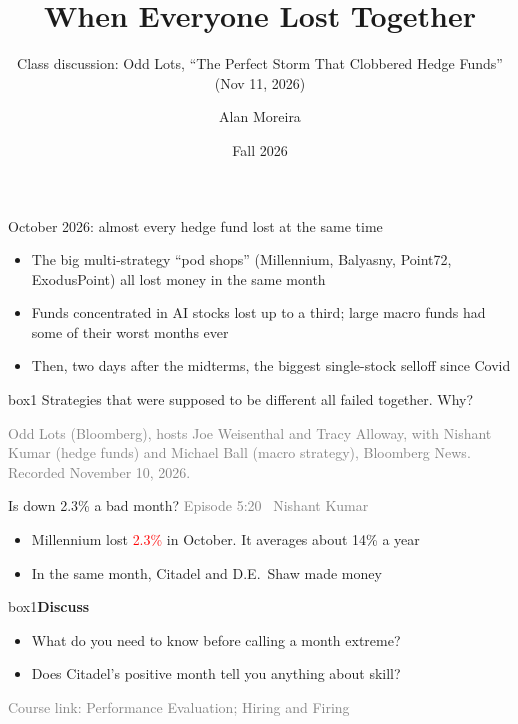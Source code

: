 \documentclass[aspectratio=169,10pt]{beamer}
\title{When Everyone Lost Together}
\subtitle{Class discussion: Odd Lots, ``The Perfect Storm That Clobbered Hedge Funds'' (Nov 11, 2026)}
\author[A. Moreira]{Alan Moreira}
\institute[Data-Driven Investing]{NYU Stern --- Data-Driven Investing}
\date{Fall 2026}
\newcommand{\src}[1]{{\footnotesize\textcolor{gray}{Episode #1}}\par\vskip 6pt}
\newcommand{\course}[1]{{\footnotesize\textcolor{gray}{Course link: #1}}}
\newenvironment{discuss}{\begin{beamercolorbox}[rounded=true,sep=8pt]{box1}\textbf{Discuss}\par\vskip 3pt}{\end{beamercolorbox}}
\begin{document}
\begin{frame}
\titlepage
\end{frame}

\begin{frame}{October 2026: almost every hedge fund lost at the same time}
\vskip 4pt
\begin{itemize}
\item The big multi-strategy ``pod shops'' (Millennium, Balyasny, Point72, ExodusPoint) all lost money in the same month
\vskip 7pt
\item Funds concentrated in AI stocks lost up to a third; large macro funds had some of their worst months ever
\vskip 7pt
\item Then, two days after the midterms, the biggest single-stock selloff since Covid
\end{itemize}
\vskip 12pt
\begin{beamercolorbox}[rounded=true,sep=8pt,center]{box1}
Strategies that were supposed to be different all failed together. Why?
\end{beamercolorbox}
\vfill
{\footnotesize\textcolor{gray}{Odd Lots (Bloomberg), hosts Joe Weisenthal and Tracy Alloway, with Nishant Kumar (hedge funds) and Michael Ball (macro strategy), Bloomberg News. Recorded November 10, 2026.}}
\end{frame}

\begin{frame}[label=q1]{Is down 2.3\% a bad month?}
\src{5:20 \textbullet\ Nishant Kumar}
\begin{itemize}
\item Millennium lost \textcolor{red}{2.3\%} in October. It averages about 14\% a year
\vskip 6pt
\item In the same month, Citadel and D.E.\ Shaw made money
\end{itemize}
\vskip 12pt
\begin{discuss}
\begin{itemize}
\item What do you need to know before calling a month extreme?
\item Does Citadel's positive month tell you anything about skill?
\end{itemize}
\end{discuss}
\vfill
\course{Performance Evaluation; Hiring and Firing} \hfill \hyperlink{appendix_z}{}
\end{frame}
\end{document}
